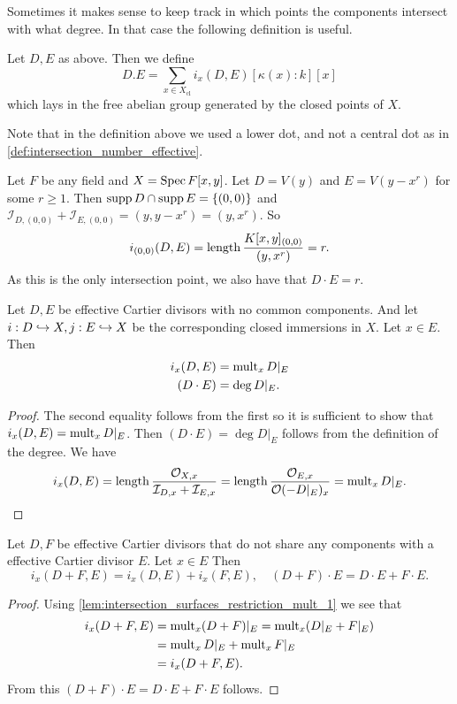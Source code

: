 Sometimes it makes sense to keep track in which points the components intersect with what degree. In that case the following definition is useful. 
\begin{definition}
	Let $D, E$ as above. 
	Then we define \[
		D.E = \sum_{x \in X_\text{cl} } i_x(D, E)[\kappa(x) :k] [x]
	\] 
	which lays in the free abelian group generated by the closed points of $X$.
\end{definition}
Note that in the definition above we used a lower dot, and not a central dot as in \cref{def:intersection_number_effective}.
\begin{example}
	Let $F$ be any field and $X = \operatorname{Spec} F[x, y]$. 
	Let  $D = V(y)$ and $E = V(y - x^r)$ for some $r \ge 1$.
	Then  $\operatorname{supp} D \cap \operatorname{supp} E = \{(0, 0)\} $ and $\mathcal{I} _{D, (0,0)} + \mathcal{I} _{E, (0,0)} = (y, y-x^r) = (y, x^r)$.
	So \[
		i_{(0,0)}(D, E) = \operatorname{length} \frac{K[x, y]_{(0, 0)}}{(y, x^{r})} = r
	.\] 
	As this is the only intersection point, we also have that $D\cdot E = r$. 
\end{example}

\begin{lemma}\label{lem:intersection_surfaces_restriction_mult_1}
	Let $D, E$ be effective Cartier divisors with no common components. And let $i: D \hookrightarrow X, j: E \hookrightarrow X$ be the corresponding closed immersions in $X$. 
	Let $x \in E$. Then  
	\begin{align*}
		i_x(D, E) &= \operatorname{mult}_x D|_E   \\
		(D\cdot E) &= \deg D|_E 
	.\end{align*}
\end{lemma}
\begin{proof}
	The second equality follows from the first so it is sufficient to show that $i_x(D, E) = \operatorname{mult}_x D|_E$. 
	Then $(D\cdot E) =\deg D|_E$ follows from the definition of the degree.  
	We have \[
		i_x(D, E) = \operatorname{length} \frac{\mathcal{O}_{X, x}}{\mathcal{I} _{D, x} + \mathcal{I} _{E, x}} =\operatorname{length} \frac{\mathcal{O}_{E, x}}{\mathcal{O}(-D|_E)_x} = \operatorname{mult}_x D|_E \\
	.\] 
\end{proof}
\begin{lemma}
	Let $D, F$ be effective Cartier divisors that do not share any components with a effective Cartier divisor $E$. Let $x \in E$
	Then  \[
		i_x (D + F, E) = i_x(D, E) + i_x(F, E), \quad (D + F) \cdot E = D\cdot E + F \cdot E
	.\] 
\end{lemma}
\begin{proof}
	Using \cref{lem:intersection_surfaces_restriction_mult_1} we see that 
	\begin{align*}
		i_x (D + F, E) &= \operatorname{mult}_x (D + F)|_E = \operatorname{mult}_x (D|_E + F|_E) \\
			       &= \operatorname{mult}_x D|_E + \operatorname{mult}_x F|_E \\
			       &= i_x(D + F, E) 
	.\end{align*}
	From this $(D + F) \cdot E = D\cdot E + F \cdot E$ follows.
\end{proof}


